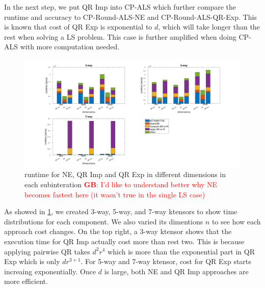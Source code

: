 \documentclass{article}
\newcommand{\GB}[1]{\textcolor{red}{\textbf{GB}: #1}}
\begin{document}
In the next step, we put QR Imp into CP-ALS which further compare the runtime and accuracy to CP-Round-ALS-NE and CP-Round-ALS-QR-Exp. 
This is known that cost of QR Exp is exponential to $d$, which will take longer than the rest when solving a LS problem.
This case is further amplified when doing CP-ALS with more computation needed.
\begin{figure}[ht!]
  \begin{center}
    \includegraphics[scale = 0.2]{7runtime.jpg}
    \caption[Figure]{runtime for NE, QR Imp and QR Exp in different dimensions in each subinteration \GB{I'd like to understand better why NE becomes fastest here (it wasn't true in the single LS case)} \label{fig:runtime}}
  \end{center}
\end{figure}


As showed in \cref{fig:runtime}, we created 3-way, 5-way, and 7-way ktensors to show time distributions for each component.
We also varied its dimentions $n$ to see how each approach cost changes.
On the top right, a 3-way ktensor shows that the execution time for QR Imp actually cost more than rest two.
This is because applying pairwise QR takes $d^2r^4$ which is more than the exponential part in QR Exp which is only $dr^{3+1}$.
For 5-way and 7-way ktensor, cost for QR Exp starts increaing exponentially.
Once $d$ is large, both NE and QR Imp approaches are more efficient.
\end{document}
